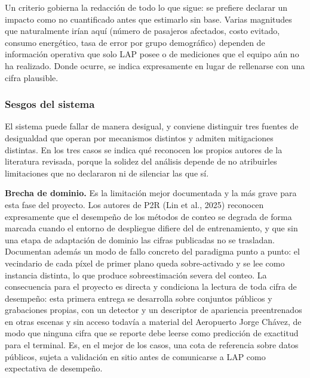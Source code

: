 Un criterio gobierna la redacción de todo lo que sigue: se prefiere
declarar un impacto como no cuantificado antes que estimarlo sin base.
Varias magnitudes que naturalmente irían aquí (número de pasajeros
afectados, costo evitado, consumo energético, tasa de error por grupo
demográfico) dependen de información operativa que solo LAP posee o de
mediciones que el equipo aún no ha realizado. Donde ocurre, se indica
expresamente en lugar de rellenarse con una cifra plausible.

\subsubsection{Sesgos del sistema}

El sistema puede fallar de manera desigual, y conviene distinguir tres
fuentes de desigualdad que operan por mecanismos distintos y admiten
mitigaciones distintas. En los tres casos se indica qué reconocen los
propios autores de la literatura revisada, porque la solidez del
análisis depende de no atribuirles limitaciones que no declararon ni de
silenciar las que sí.

\textbf{Brecha de dominio.} Es la limitación mejor documentada y la más
grave para esta fase del proyecto. Los autores de P2R
(Lin et al., 2025) reconocen expresamente que el desempeño de los
métodos de conteo se degrada de forma marcada cuando el entorno de
despliegue difiere del de entrenamiento, y que sin una etapa de
adaptación de dominio las cifras publicadas no se trasladan. Documentan
además un modo de fallo concreto del paradigma punto a punto: el
vecindario de cada píxel de primer plano queda sobre-activado y se lee
como instancia distinta, lo que produce sobreestimación severa del
conteo. La consecuencia para el proyecto es directa y condiciona la lectura de
toda cifra de desempeño: esta primera entrega se desarrolla sobre conjuntos
públicos y grabaciones propias, con un detector y un descriptor de apariencia
preentrenados en otras escenas y sin acceso todavía a material del
Aeropuerto Jorge Chávez, de modo que ninguna cifra que se reporte debe leerse
como predicción de exactitud para el terminal. Es, en el mejor de
los casos, una cota de referencia sobre datos públicos, sujeta a
validación en sitio antes de comunicarse a LAP como expectativa de
desempeño.

